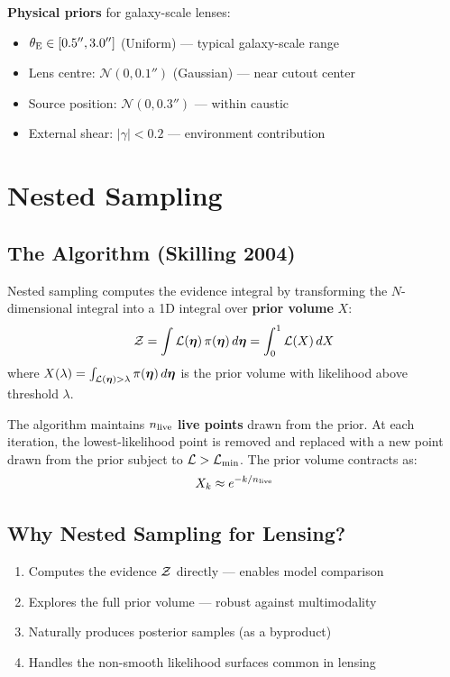 \documentclass[11pt, letterpaper]{article}
\begin{document}
\textbf{Physical priors} for galaxy-scale lenses:
\begin{itemize}[nosep]
  \item $\theta_{\rm E} \in [0.5'', 3.0'']$ (Uniform) — typical galaxy-scale range
  \item Lens centre: $\mathcal{N}(0, 0.1'')$ (Gaussian) — near cutout center
  \item Source position: $\mathcal{N}(0, 0.3'')$ — within caustic
  \item External shear: $|\gamma| < 0.2$ — environment contribution
\end{itemize}

\section{Nested Sampling}
\label{sec:nested-sampling}

\subsection{The Algorithm (Skilling 2004)}

Nested sampling computes the evidence integral by transforming the
$N$-dimensional integral into a 1D integral over \textbf{prior volume}
$X$:
\begin{equation}
\mathcal{Z} = \int \mathcal{L}(\bm{\eta})\,\pi(\bm{\eta})\,d\bm{\eta}
= \int_0^1 \mathcal{L}(X)\,dX
\label{eq:evidence-integral}
\end{equation}
where $X(\lambda) = \int_{\mathcal{L}(\bm{\eta}) > \lambda} \pi(\bm{\eta})\,d\bm{\eta}$
is the prior volume with likelihood above threshold $\lambda$.

The algorithm maintains $n_{\rm live}$ \textbf{live points} drawn from
the prior. At each iteration, the lowest-likelihood point is removed
and replaced with a new point drawn from the prior subject to
$\mathcal{L} > \mathcal{L}_{\rm min}$. The prior volume contracts as:
\begin{equation}
X_k \approx e^{-k/n_{\rm live}}
\label{eq:volume-contraction}
\end{equation}

\subsection{Why Nested Sampling for Lensing?}

\begin{enumerate}[nosep]
  \item Computes the evidence $\mathcal{Z}$ directly — enables model comparison
  \item Explores the full prior volume — robust against multimodality
  \item Naturally produces posterior samples (as a byproduct)
  \item Handles the non-smooth likelihood surfaces common in lensing
\end{enumerate}
\end{document}
